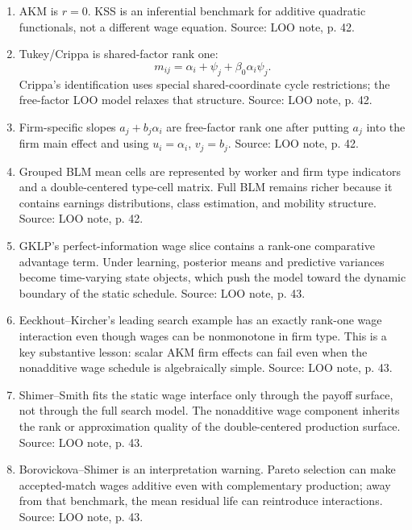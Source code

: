 \documentclass[11pt]{article}
\begin{document}
\begin{enumerate}
\item AKM is \(r=0\). KSS is an inferential benchmark for additive quadratic
functionals, not a different wage equation. Source: LOO note, p. 42.

\item Tukey/Crippa is shared-factor rank one:
\[
m_{ij}=\alpha_i+\psi_j+\beta_0\alpha_i\psi_j.
\]
Crippa's identification uses special shared-coordinate cycle restrictions; the
free-factor LOO model relaxes that structure. Source: LOO note, p. 42.

\item Firm-specific slopes \(a_j+b_j\alpha_i\) are free-factor rank one after
putting \(a_j\) into the firm main effect and using \(u_i=\alpha_i\),
\(v_j=b_j\). Source: LOO note, p. 42.

\item Grouped BLM mean cells are represented by worker and firm type indicators
and a double-centered type-cell matrix. Full BLM remains richer because it
contains earnings distributions, class estimation, and mobility structure.
Source: LOO note, p. 42.

\item GKLP's perfect-information wage slice contains a rank-one comparative
advantage term. Under learning, posterior means and predictive variances become
time-varying state objects, which push the model toward the dynamic boundary of
the static schedule. Source: LOO note, p. 43.

\item Eeckhout--Kircher's leading search example has an exactly rank-one wage
interaction even though wages can be nonmonotone in firm type. This is a key
substantive lesson: scalar AKM firm effects can fail even when the nonadditive
wage schedule is algebraically simple. Source: LOO note, p. 43.

\item Shimer--Smith fits the static wage interface only through the payoff
surface, not through the full search model. The nonadditive wage component
inherits the rank or approximation quality of the double-centered production
surface. Source: LOO note, p. 43.

\item Borovickova--Shimer is an interpretation warning. Pareto selection can
make accepted-match wages additive even with complementary production; away from
that benchmark, the mean residual life can reintroduce interactions. Source:
LOO note, p. 43.
\end{enumerate}
\end{document}
